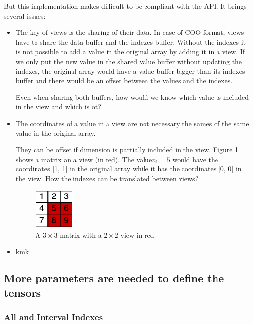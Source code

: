 
But this implementation makes difficult to be compliant with the API. It brings several issues:
\begin{itemize}
	\item The key of views is the sharing of their data. In case of COO format, views have to share the data buffer and the indexes buffer. Without the indexes it is not possible to add a value in the original array by adding it in a view. If we only put the new value in the shared value buffer without updating the indexes, the original array would have a value buffer bigger than its indexes buffer and there would be an offset between the values and the indexes. 
	
	Even when sharing both buffers, how would we know which value is included in the view and which is ot? 	
	
	\item The coordinates of a value in a view are not necessary the sames of the same value in the original array. 
		
	They can be offset if dimension is partially included in the view. Figure \ref{fig:viewOffset} shows a matrix an a view (in red). The value$ v_{i}=5$ would have the coordinates [1, 1] in the original array while it has the coordinates [0, 0] in the view. How the indexes can be translated between views?
	\begin{figure}[!h]
		\centering
		\includegraphics[width=0.8in]{images/viewIndexOffset.pdf}
		\caption{A $3\times 3$ matrix with a $2\times 2$ view in red}
		\label{fig:viewOffset}
	\end{figure}

	\item kmk
\end{itemize}

\subsection{More parameters are needed to define the tensors}


\subsubsection{All and Interval Indexes}
